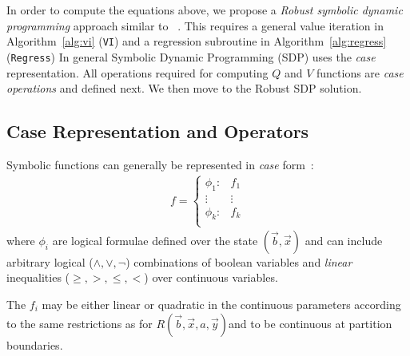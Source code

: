 In order to compute the equations above, we propose a \emph{Robust symbolic dynamic programming} approach similar to ~\cite{sanner_uai11}.  This requires a general value iteration in Algorithm~\ref{alg:vi} (\texttt{VI})
and a regression subroutine in Algorithm~\ref{alg:regress}
(\texttt{Regress}) %
In general Symbolic Dynamic Programming (SDP) uses the \emph{case} representation. All operations required for computing $Q$ and $V$ functions are \emph{case operations} and defined next. We then move to the Robust SDP solution. 

\subsection{Case Representation and Operators}

Symbolic functions can generally be represented in \emph{case} form~\cite{fomdp}:
{%
\begin{align}
f = 
\begin{cases}
  \phi_1: & f_1 \\ 
 \vdots&\vdots\\ 
  \phi_k: & f_k \\ 
\end{cases} \label{eq:case}
\end{align}
}
where $\phi_i$ are logical formulae defined over the state
$(\vec{b},\vec{x})$ and can include arbitrary logical ($\land,\lor,\neg$)
combinations of boolean variables and \emph{linear} inequalities ($\geq,>,\leq,<$) 
over continuous variables.  

The $f_i$ may be either linear or quadratic in the continuous parameters according to the same restrictions as for 
$R(\vec{b},\vec{x},a,\vec{y})$and to be continuous at partition boundaries. 


